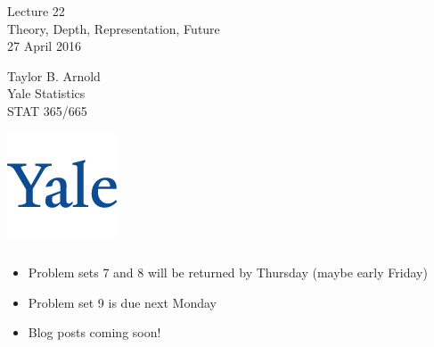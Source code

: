 \documentclass[xetex,mathserif,serif,aspectratio=169]{beamer}
\begin{document}
\begin{frame}[fragile] \frametitle{} \oldB \small

\vfill

{\fontsize{0.7cm}{0cm}\selectfont Lecture 22 \\\vspace{0.2cm}
Theory, Depth, Representation, Future}\\\vspace{0.5cm}
27 April 2016

\vspace{2cm}

\begin{minipage}{0.6\textwidth}
Taylor B. Arnold \\
Yale Statistics \\
STAT 365/665
\end{minipage}
\hfill
\begin{minipage}{0.3\textwidth}\raggedleft
\includegraphics[scale=0.3]{../yale-logo.png}
\end{minipage}%

\end{frame}

\begin{frame}[fragile] \frametitle{} \oldB \small


\begin{itemize}
\item Problem sets 7 and 8 will be returned by Thursday (maybe early Friday)
\item Problem set 9 is due next Monday
\item Blog posts coming soon!
\end{itemize}

\end{frame}
\end{document}
